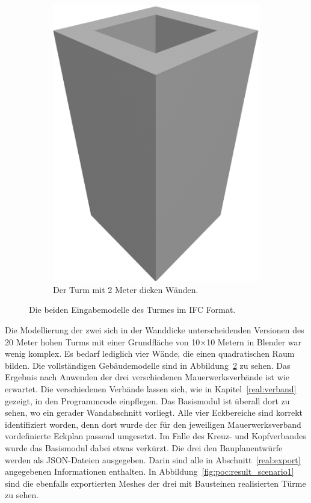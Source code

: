 \begin{figure}[hbt]
\begin{subfigure}[b]{0.25\columnwidth}
    \includegraphics[width=\columnwidth]{fig/scenario1_render_base_thick.png}
    \caption{Der Turm mit 2 Meter dicken Wänden.}\label{fig:poc:scenario1_wall_thick}
  \end{subfigure}
  \hspace*{\fill}%
  \caption{Die beiden Eingabemodelle des Turmes im IFC Format.}\label{fig:poc:scenario1 modell}
\end{figure}
Die Modellierung der zwei sich in der Wanddicke unterscheidenden Versionen des 20 Meter hohen Turms mit einer Grundfläche von 10$\times$10 Metern in Blender war wenig komplex.
Es bedarf lediglich vier Wände, die einen quadratischen Raum bilden.
Die vollständigen Gebäudemodelle sind in Abbildung~\ref{fig:poc:scenario1 modell} zu sehen.
Das Ergebnis nach Anwenden der drei verschiedenen Mauerwerksverbände ist wie erwartet.
Die verschiedenen Verbände lassen sich, wie in Kapitel~\ref{real:verband} gezeigt, in den Programmcode einpflegen.
Das Basismodul ist überall dort zu sehen, wo ein gerader Wandabschnitt vorliegt.
Alle vier Eckbereiche sind korrekt identifiziert worden, denn dort wurde der für den jeweiligen Mauerwerksverband vordefinierte Eckplan passend umgesetzt.
Im Falle des Kreuz- und Kopfverbandes wurde das Basismodul dabei etwas verkürzt.
Die drei den Bauplanentwürfe werden als JSON-Dateien ausgegeben.
Darin sind alle in Abschnitt~\ref{real:export} angegebenen Informationen enthalten.
In Abbildung~\ref{fig:poc:result_scenario1} sind die ebenfalls exportierten Meshes der drei mit Bausteinen realisierten Türme zu sehen.

